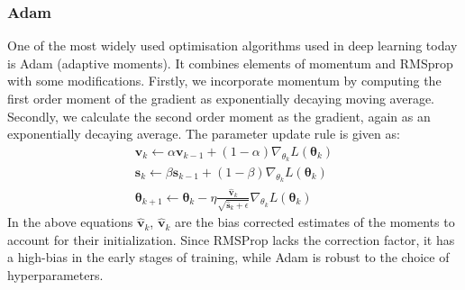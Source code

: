 \documentclass[11pt]{article}
\begin{document}
    \subsubsection{Adam}
    One of the most widely used optimisation algorithms used in deep learning today is Adam (adaptive moments).
    It combines elements of momentum and RMSprop with some modifications.
    Firstly, we incorporate momentum by computing the first order moment of the gradient as exponentially decaying
    moving average.
    Secondly, we calculate the second order moment as the gradient, again as an exponentially decaying average.
    The parameter update rule is given as:
    \begin{align*}
        \pmb{v}_k \gets \alpha \pmb{v}_{k-1} + (1 - \alpha) \nabla_{\theta_k} L( \pmb\theta_{k} ) \\
        \pmb{s}_k \gets \beta \pmb{s}_{k-1} + (1 - \beta) \nabla_{\theta_k} L( \pmb\theta_{k} ) \\
        \pmb\theta_{k+1} \gets \pmb\theta_{k} - \eta \frac{\hat{\pmb{v}}_k}{  \sqrt{ \hat{\pmb{s}}_k  + \epsilon }} \nabla_{\theta_k} L( \pmb\theta_k)
    \end{align*}
    In the above equations $\hat{\pmb{v}}_k$, $\hat{\pmb{v}}_k$ are the bias corrected estimates of the moments to account
    for their initialization.
    Since RMSProp lacks the correction factor, it has a high-bias in the early stages of training, while Adam is
    robust to the choice of hyperparameters.
\end{document}
